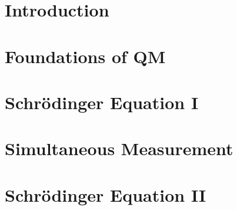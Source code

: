 \documentclass[british,11pt,a4paper]{report}
\begin{document}
\maketitle
\tableofcontents

\chapter{Introduction}

\chapter{Foundations of QM}

\chapter{Schr\"odinger Equation I}
\chapter{Simultaneous Measurement}
\chapter{Schr\"odinger Equation II}
\end{document}
